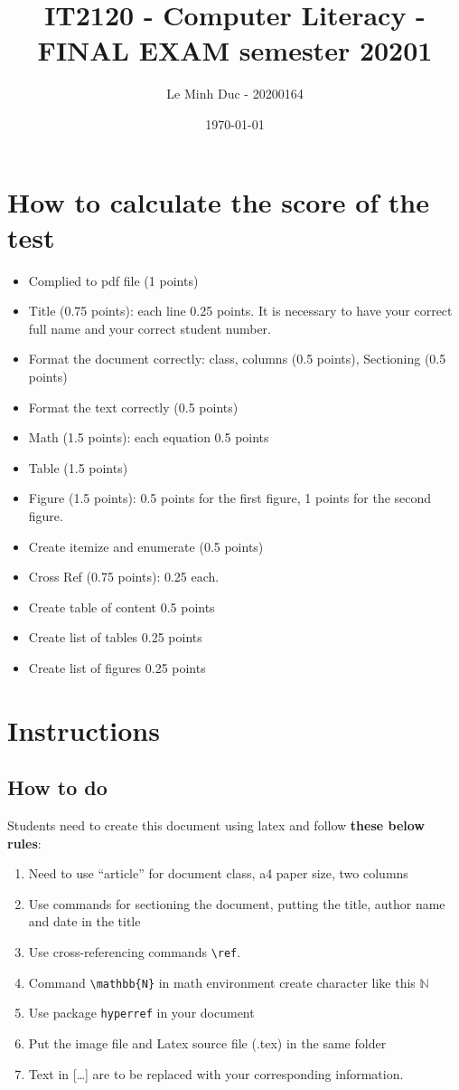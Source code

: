\documentclass[a4paper,10pt,twocolumn]{article}
\title{IT2120 - Computer Literacy - FINAL EXAM semester 20201}
\author{Le Minh Duc - 20200164}
\date{\today}
\begin{document}
\twocolumn

\maketitle

\section{How to calculate the score of the test}
\begin{itemize}
\item Complied to pdf file (1 points)
\item Title (0.75 points): each line 0.25 points. It is necessary to have your correct full name and your correct student number.
\item Format the document correctly: class, columns (0.5 points), Sectioning (0.5 points)
\item Format the text correctly (0.5 points)
\item Math (1.5 points): each equation 0.5 points
\item Table (1.5 points)
\item Figure (1.5 points): 0.5 points for the first figure, 1 points for the second figure.
\item Create itemize and enumerate (0.5 points)
\item Cross Ref (0.75 points): 0.25 each.
\item Create table of content 0.5 points
\item Create list of tables 0.25 points
\item Create list of figures 0.25 points
\end{itemize}

\section{Instructions}
\subsection{How to do}
Students need to create this document using latex and follow \textbf{these below rules}:
\begin{enumerate}
\item Need to use ``article'' for document class, a4 paper size, two columns
\item Use commands for sectioning the document, putting the title, author name and date in the title
\item Use cross-referencing commands \texttt{\textbackslash ref}.
\item Command \texttt{\textbackslash mathbb\{N\}} in math environment create character like this $\mathbb{N}$
\item Use package \texttt{hyperref} in your document
\item Put the image file and Latex source file (.tex) in the same folder
\item Text in [\ldots] are to be replaced with your corresponding information.
\end{enumerate}
\end{document}
